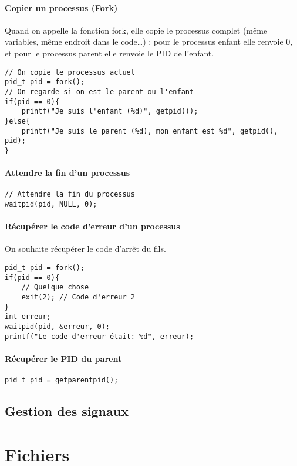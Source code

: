 \documentclass[10pt,a4paper,french]{article}
\begin{document}
\paragraph{Copier un processus (Fork)}
Quand on appelle la fonction fork, elle copie le processus complet (même variables, même endroit dans le code\ldots) ; pour le processus enfant elle renvoie 0, et pour le processus parent elle renvoie le PID de l'enfant.
\begin{verbatim}
// On copie le processus actuel
pid_t pid = fork();
// On regarde si on est le parent ou l'enfant
if(pid == 0){
    printf("Je suis l'enfant (%d)", getpid());
}else{
    printf("Je suis le parent (%d), mon enfant est %d", getpid(), pid);
}
\end{verbatim}

\paragraph{Attendre la fin d'un processus}
\begin{verbatim}
// Attendre la fin du processus
waitpid(pid, NULL, 0);
\end{verbatim}

\paragraph{Récupérer le code d'erreur d'un processus}
On souhaite récupérer le code d'arrêt du fils.

\begin{verbatim}
pid_t pid = fork();
if(pid == 0){
    // Quelque chose
    exit(2); // Code d'erreur 2
}
int erreur;
waitpid(pid, &erreur, 0);
printf("Le code d'erreur était: %d", erreur);
\end{verbatim}

\paragraph{Récupérer le PID du parent}
\begin{verbatim}
pid_t pid = getparentpid();
\end{verbatim}

\subsection{Gestion des signaux}

\section{Fichiers}
\end{document}
